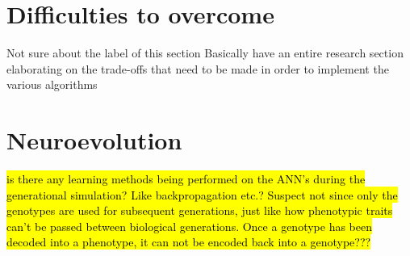 \section{Difficulties to overcome}
Not sure about the label of this section
Basically have an entire research section elaborating on the trade-offs that need to be made in order to implement the various algorithms




\section{Neuroevolution}


\hl{is there any learning methods being performed on the ANN's during the generational simulation? Like backpropagation etc.? Suspect not since only the genotypes are used for subsequent generations, just like how phenotypic traits can't be passed between biological generations. Once a genotype has been decoded into a phenotype, it can not be encoded back into a genotype???}


